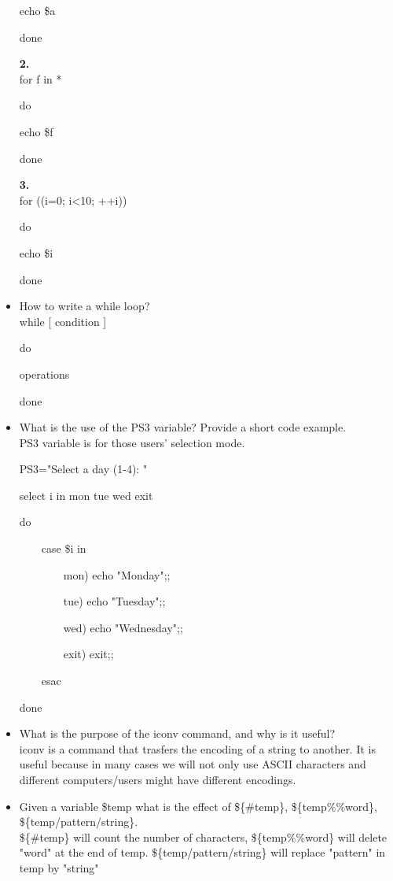 \documentclass{article}
\begin{document}
\begin{itemize}
\qquad echo \$a

done

{\bf 2. }\\
for f in *

do

\qquad echo \$f

done

{\bf 3. }\\
for ((i=0; i<10; ++i))

do

\qquad echo \$i 

done


\item How to write a while loop? \\
while [ condition ]

do

\qquad operations 

done

\item What is the use of the PS3 variable? Provide a short code example.\\
PS3 variable is for those users' selection mode.

PS3="Select a day (1-4): "

select i in mon tue wed exit

do

    \qquad case \$i in

        \qquad \qquad mon) echo "Monday";;

        \qquad \qquad tue) echo "Tuesday";;

        \qquad \qquad wed) echo "Wednesday";;

        \qquad \qquad exit) exit;;

    \qquad esac

done
\item What is the purpose of the iconv command, and why is it useful?\\
iconv is a command that trasfers the encoding of a string to another. It is useful because in many cases we will not only use ASCII characters and different computers/users might have different encodings.
\item Given a variable \$temp what is the effect of \$\{\#temp\}, \$\{temp\%\%word\}, \$\{temp/pattern/string\}.\\
\$\{\#temp\} will count the number of characters, \$\{temp\%\%word\} will delete "word" at the end of temp.  \$\{temp/pattern/string\} will replace "pattern" in temp by "string"


\end{itemize}
\end{document}
